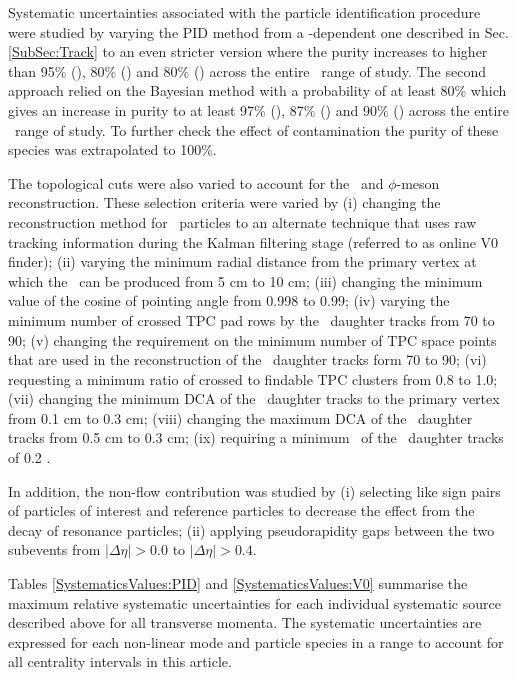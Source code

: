 Systematic uncertainties associated with the particle identification procedure were studied by varying the PID method from a \pT-dependent one described in Sec. \ref{SubSec:Track} to an even stricter version where the purity increases to higher than 95\% (\pion), 80\% (\kaon) and 80\% (\proton) across the entire \pT~range of study. The second approach relied on the Bayesian method with a probability of at least 80\% which gives an increase in purity to at least 97\% (\pion), 87\% (\kaon) and 90\% (\proton) across the entire \pT~range of study. To further check the effect of contamination the purity of these species was extrapolated to 100\%. 

The topological cuts were also varied to account for the \vo~and $\phi$-meson reconstruction. These selection criteria were varied by 
(i) changing the reconstruction method for  \vo~particles to an alternate technique that uses raw tracking information during the Kalman filtering stage (referred to as online V0 finder); (ii) varying the minimum radial distance from the primary vertex at which the \vo~can be produced from 5 cm to 10 cm; (iii) changing the minimum value of the cosine of pointing angle from 0.998 to 0.99; (iv) varying the minimum number of crossed TPC pad rows by the \vo~daughter tracks from 70 to 90; (v) changing the requirement on the minimum number of TPC space points that are used in the reconstruction of the \vo~daughter tracks form 70 to 90; (vi) requesting a minimum ratio of crossed to findable TPC clusters from 0.8 to 1.0; (vii) changing the minimum DCA of the \vo~daughter tracks to the primary vertex from 0.1 cm to 0.3 cm; (viii) changing the maximum DCA of the \vo~daughter tracks from 0.5 cm to 0.3 cm; (ix) requiring a minimum \pT~of the \vo~daughter tracks of 0.2 \GeV. 

In addition, the non-flow contribution was studied by (i) selecting like sign pairs of particles of interest and reference particles to decrease the effect from the decay of resonance particles; (ii) applying pseudorapidity gaps between the two subevents from $|\Delta\eta|>0.0$ to $|\Delta\eta|>0.4$.

Tables \ref{SystematicsValues:PID} and \ref{SystematicsValues:V0} summarise the maximum relative systematic uncertainties for each individual systematic source described above for all transverse momenta. The systematic uncertainties are expressed for each non-linear mode and particle species in a range to account for all centrality intervals in this article. 

